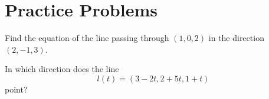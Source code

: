 \documentclass[openany]{book}
\newcommand{\R}{\mathbb{R}}
\begin{document}




















\chapter{Practice Problems}


\begin{prob}
    Find the equation of the line passing through $(1,0,2)$ in the direction $(2,-1,3)$.
\end{prob}

\begin{prob}
    In which direction does the line 
    \begin{equation*}
        l(t)=(3-2t, 2+5t, 1+t)
    \end{equation*}
    point?
\end{prob}
\end{document}
